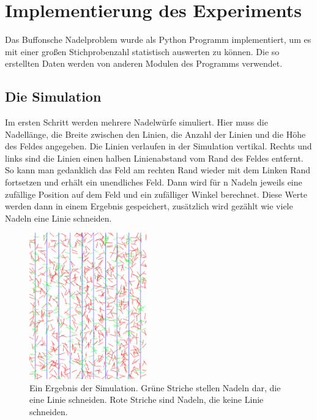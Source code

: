 \documentclass[10pt,twocolumn]{scrartcl}
\begin{document}
\section{Implementierung des Experiments}
	Das Buffonsche Nadelproblem wurde als Python\cite{Python} Programm implementiert, um es mit einer großen Stichprobenzahl statistisch auswerten zu können. Die so erstellten Daten werden von anderen Modulen des Programms verwendet.

	\subsection*{Die Simulation}
		\label{chap_sim_results}
		Im ersten Schritt werden mehrere Nadelwürfe simuliert. Hier muss die Nadellänge, die Breite zwischen den Linien, die Anzahl der Linien und die Höhe des Feldes angegeben. Die Linien verlaufen in der Simulation vertikal. Rechts und links sind die Linien einen halben Linienabstand vom Rand des Feldes entfernt. So kann man gedanklich das Feld am rechten Rand wieder mit dem Linken Rand fortsetzen und erhält ein unendliches Feld. Dann wird für n Nadeln jeweils eine zufällige Position auf dem Feld und ein zufälliger Winkel berechnet. Diese Werte werden dann in einem Ergebnis gespeichert, zusätzlich wird gezählt wie viele Nadeln eine Linie schneiden.

		\begin{figure}[htb]
			\centering
			\includegraphics[width=0.45\textwidth]{images/needels.png}
			\caption{Ein Ergebnis der Simulation. Grüne Striche stellen Nadeln dar, die eine Linie schneiden. Rote Striche sind Nadeln, die keine Linie schneiden.}
			\label{fig:needels}
		\end{figure}
\end{document}
